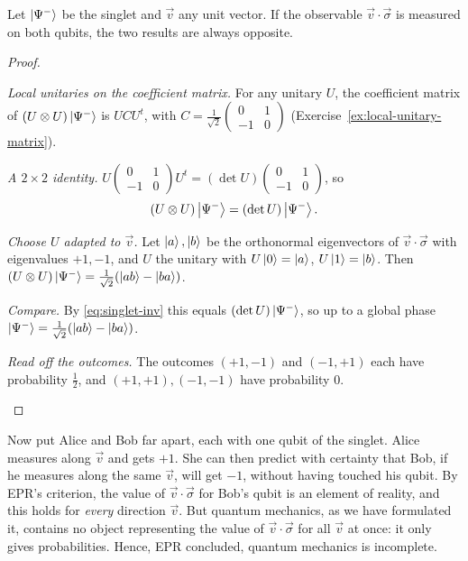 \begin{proposition}\label{prop:singlet-anticorr}
  Let $\left|\Psi^-\right\rangle$ be the singlet and $\vec v$ any unit vector. If the observable $\vec v\cdot\vec\sigma$ is measured on both qubits, the two results are always opposite.
\end{proposition}
\begin{proof}
  \begin{steps}
    \item \emph{Local unitaries on the coefficient matrix.} For any unitary $U$, the coefficient matrix of $(U\otimes U)\left|\Psi^-\right\rangle$ is $UCU^t$, with $C=\frac1{\sqrt2}\begin{pmatrix}0&1\\-1&0\end{pmatrix}$ (Exercise~\ref{ex:local-unitary-matrix}).
    \item \emph{A $2\times2$ identity.} $U\begin{pmatrix}0&1\\-1&0\end{pmatrix}U^t=(\det U)\begin{pmatrix}0&1\\-1&0\end{pmatrix}$, so
      \begin{equation}\label{eq:singlet-inv}
        (U\otimes U)\left|\Psi^-\right\rangle=(\det U)\left|\Psi^-\right\rangle.
      \end{equation}
    \item \emph{Choose $U$ adapted to $\vec v$.} Let $\left|a\right\rangle,\left|b\right\rangle$ be the orthonormal eigenvectors of $\vec v\cdot\vec\sigma$ with eigenvalues $+1,-1$, and $U$ the unitary with $U\left|0\right\rangle=\left|a\right\rangle$, $U\left|1\right\rangle=\left|b\right\rangle$. Then $(U\otimes U)\left|\Psi^-\right\rangle=\frac1{\sqrt2}(\left|ab\right\rangle-\left|ba\right\rangle)$.
    \item \emph{Compare.} By \eqref{eq:singlet-inv} this equals $(\det U)\left|\Psi^-\right\rangle$, so up to a global phase $\left|\Psi^-\right\rangle=\frac1{\sqrt2}(\left|ab\right\rangle-\left|ba\right\rangle)$.
    \item \emph{Read off the outcomes.} The outcomes $(+1,-1)$ and $(-1,+1)$ each have probability $\tfrac12$, and $(+1,+1),(-1,-1)$ have probability $0$. \qedhere
  \end{steps}
\end{proof}

Now put Alice and Bob far apart, each with one qubit of the singlet. Alice measures along $\vec v$ and gets $+1$. She can then predict with certainty that Bob, if he measures along the same $\vec v$, will get $-1$, without having touched his qubit. By EPR's criterion, the value of $\vec v\cdot\vec\sigma$ for Bob's qubit is an element of reality, and this holds for \emph{every} direction $\vec v$.
But quantum mechanics, as we have formulated it, contains no object representing the value of $\vec v\cdot\vec\sigma$ for all $\vec v$ at once: it only gives probabilities. Hence, EPR concluded, quantum mechanics is incomplete.

